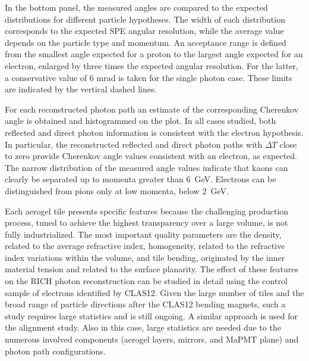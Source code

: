 \documentclass[5p,times,twocolumn]{elsarticle}
\def\dT{$\Delta T$ }
\begin{document}
In the bottom panel, the measured angles are compared to the expected distributions for different particle
hypotheses. The width of each distribution corresponds to the expected SPE angular resolution, while the average
value depends on the particle type and momentum. An acceptance range is defined from the smallest angle expected
for a proton to the largest angle expected for an electron, enlarged by three times the expected angular resolution.
For the latter, a conservative value of 6 mrad is taken for the single photon case. These limits are indicated by the
vertical dashed lines. 


For each reconstructed photon path an estimate of the corresponding Cherenkov angle is obtained and
histogrammed on the plot. In all cases studied, both reflected and direct photon information is consistent with
the electron hypothesis. In particular, the reconstructed reflected and direct photon paths with \dT close to
zero provide Cherenkov angle values consistent with an electron, as expected. The narrow distribution of the
measured angle values indicate that kaons can clearly be separated up to momenta greater than 6~GeV. Electrons
can be distinguished from pions only at low momenta, below 2~GeV.

Each aerogel tile presents specific features because the challenging production process, tuned to achieve the
highest transparency over a large volume, is not fully industrialized. The most important quality parameters are the
density, related to the average refractive index, homogeneity, related to the refractive index variations within the
volume, and tile bending, originated by the inner material tension and related to the surface planarity. The effect of
these features on the RICH photon reconstruction can be studied in detail using the control sample of electrons
identified by CLAS12. Given the large number of tiles and the broad range of particle directions after the CLAS12
bending magnets, such a study requires large statistics and is still ongoing. A similar approach is used for the
alignment study. Also in this case, large statistics are needed due to the numerous involved components (aerogel
layers, mirrors, and MaPMT plane) and photon path configurations. 
\end{document}
